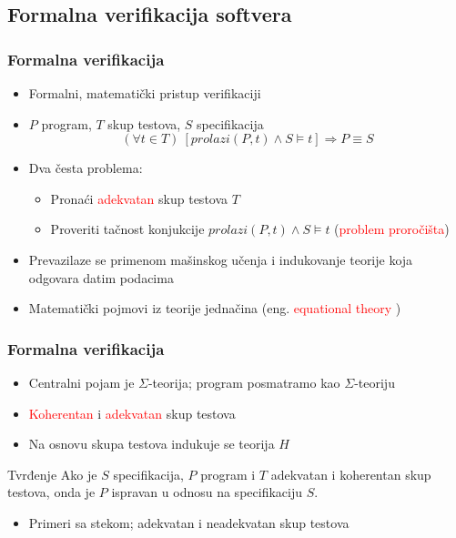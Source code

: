 \documentclass[11pt]{beamer}
\theoremstyle{definition}
\begin{document}
\subsection{Formalna verifikacija softvera}
\label{subsec:formalna-verifikacija}
\begin{frame}
\frametitle{Formalna verifikacija}
\begin{itemize}
\item Formalni, matematički pristup verifikaciji \cite{verify}
\item $P$ program, $T$ skup testova, $S$ specifikacija
$$(\forall t\in T)\ [prolazi(P,t)\wedge S\models t]\Rightarrow P\equiv S$$
\item Dva česta problema:
	\begin{itemize}
	\item Pronaći \textcolor{red}{adekvatan} skup testova $T$
	\item Proveriti tačnost konjukcije $prolazi(P,t)\wedge S\models t$ (\textcolor{red}{problem proročišta})
	\end{itemize}
\item Prevazilaze se primenom mašinskog učenja i indukovanje teorije koja odgovara datim podacima
\item Matematički pojmovi iz teorije jednačina (eng. \textcolor{red}{equational theory} \cite{equationaltheory})
\end{itemize}
\end{frame}

\begin{frame}
\frametitle{Formalna verifikacija}
\begin{itemize}
\item Centralni pojam je $\Sigma$-teorija; program posmatramo kao $\Sigma$-teoriju
\item \textcolor{red}{Koherentan} i \textcolor{red}{adekvatan} skup testova
\item Na osnovu skupa testova indukuje se teorija $H$
\end{itemize}

\begin{block}{Tvrđenje}
Ako je $S$ specifikacija, $P$ program i $T$ adekvatan i koherentan skup testova, onda je $P$ ispravan u odnosu na specifikaciju $S$.
\end{block}

\begin{itemize}
\item Primeri sa stekom; adekvatan i neadekvatan skup testova
\end{itemize}
\end{frame}
\end{document}

